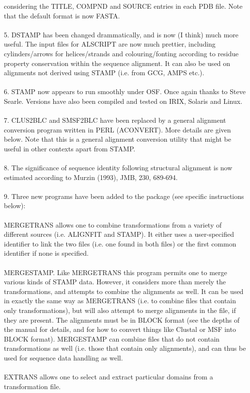 considering the TITLE, COMPND and SOURCE entries in each PDB file.  Note that the
default format is now FASTA.\\
\\
5. DSTAMP has been changed drammatically, and is now (I think) much more useful.  The
input files for ALSCRIPT are now much prettier, including cylinders/arrows for helices/strands 
and colouring/fonting according to residue property conservation within the sequence alignment.
It can also be used on alignments not derived using STAMP (i.e. from GCG, AMPS etc.).\\
\\
6. STAMP now appears to run smoothly under OSF.  Once again thanks to Steve Searle.  Versions
have also been compiled and tested on IRIX, Solaris and Linux.\\
\\
7. CLUS2BLC and SMSF2BLC have been replaced by a general alignment conversion program written
in PERL (ACONVERT).  More details are given below.  Note that this is a general alignment
conversion utility that might be useful in other contexts apart from STAMP.\\
\\
8. The significance of sequence identity following structural alignment is now estimated 
according to Murzin (1993), JMB, 230, 689-694.\\
\\
9. Three new programs have been added to the package (see specific instructions below):\\
\\
MERGETRANS allows one to combine transformations from a variety of different 
sources (i.e. ALIGNFIT and STAMP).  It either uses a user-specified identifier to link the 
two files (i.e. one found in both files) or the first common identifier if none is specified.\\
\\
MERGESTAMP.  Like MERGETRANS this program permits one to merge
various kinds of STAMP data.  However, it considers more than merely
the transformations, and attempts to combine the alignments as well.
It can be used in exactly the same way as MERGETRANS (i.e. to combine
files that contain only transformations), but will also attempt to merge
alignments in the file, if they are present.  The alignments must be
in BLOCK format (see the depths of the manual for details, and for how
to convert things like Clustal or MSF into BLOCK format).  MERGESTAMP
can combine files that do not contain transformations as well (i.e. those
that contain only alignments), and can thus be used for sequence data
handling as well.\\
\\
EXTRANS allows one to select and extract particular domains from a transformation file. 


